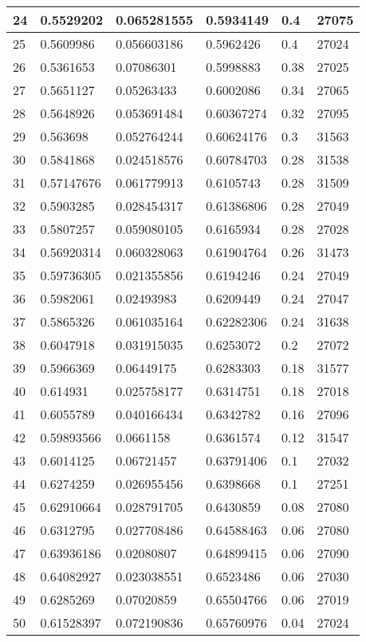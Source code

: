 \begin{longtable}{|l|l|l|l|l|l|}
24 & 0.5529202 & 0.065281555 & 0.5934149 & 0.4 & 27075 \\ \hline 
25 & 0.5609986 & 0.056603186 & 0.5962426 & 0.4 & 27024 \\ \hline 
26 & 0.5361653 & 0.07086301 & 0.5998883 & 0.38 & 27025 \\ \hline 
27 & 0.5651127 & 0.05263433 & 0.6002086 & 0.34 & 27065 \\ \hline 
28 & 0.5648926 & 0.053691484 & 0.60367274 & 0.32 & 27095 \\ \hline 
29 & 0.563698 & 0.052764244 & 0.60624176 & 0.3 & 31563 \\ \hline 
30 & 0.5841868 & 0.024518576 & 0.60784703 & 0.28 & 31538 \\ \hline 
31 & 0.57147676 & 0.061779913 & 0.6105743 & 0.28 & 31509 \\ \hline 
32 & 0.5903285 & 0.028454317 & 0.61386806 & 0.28 & 27049 \\ \hline 
33 & 0.5807257 & 0.059080105 & 0.6165934 & 0.28 & 27028 \\ \hline 
34 & 0.56920314 & 0.060328063 & 0.61904764 & 0.26 & 31473 \\ \hline 
35 & 0.59736305 & 0.021355856 & 0.6194246 & 0.24 & 27049 \\ \hline 
36 & 0.5982061 & 0.02493983 & 0.6209449 & 0.24 & 27047 \\ \hline 
37 & 0.5865326 & 0.061035164 & 0.62282306 & 0.24 & 31638 \\ \hline 
38 & 0.6047918 & 0.031915035 & 0.6253072 & 0.2 & 27072 \\ \hline 
39 & 0.5966369 & 0.06449175 & 0.6283303 & 0.18 & 31577 \\ \hline 
40 & 0.614931 & 0.025758177 & 0.6314751 & 0.18 & 27018 \\ \hline 
41 & 0.6055789 & 0.040166434 & 0.6342782 & 0.16 & 27096 \\ \hline 
42 & 0.59893566 & 0.0661158 & 0.6361574 & 0.12 & 31547 \\ \hline 
43 & 0.6014125 & 0.06721457 & 0.63791406 & 0.1 & 27032 \\ \hline 
44 & 0.6274259 & 0.026955456 & 0.6398668 & 0.1 & 27251 \\ \hline 
45 & 0.62910664 & 0.028791705 & 0.6430859 & 0.08 & 27080 \\ \hline 
46 & 0.6312795 & 0.027708486 & 0.64588463 & 0.06 & 27080 \\ \hline 
47 & 0.63936186 & 0.02080807 & 0.64899415 & 0.06 & 27090 \\ \hline 
48 & 0.64082927 & 0.023038551 & 0.6523486 & 0.06 & 27030 \\ \hline 
49 & 0.6285269 & 0.07020859 & 0.65504766 & 0.06 & 27019 \\ \hline 
50 & 0.61528397 & 0.072190836 & 0.65760976 & 0.04 & 27024 \\ \hline 
\end{longtable}